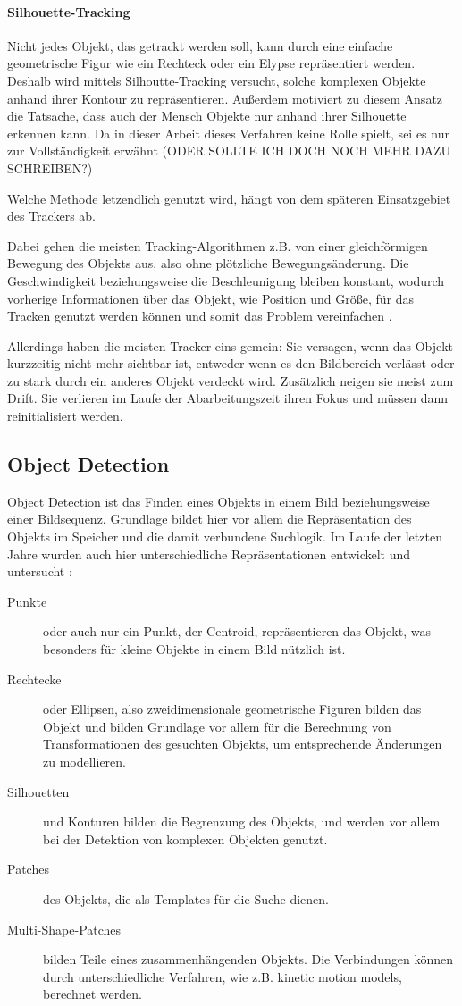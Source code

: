 \paragraph{Silhouette-Tracking}
Nicht jedes Objekt, das getrackt werden soll, kann durch eine einfache geometrische Figur wie ein Rechteck oder ein Elypse repräsentiert werden. Deshalb wird mittels Silhoutte-Tracking versucht, solche komplexen Objekte anhand ihrer Kontour zu repräsentieren. Außerdem motiviert zu diesem Ansatz die Tatsache, dass auch der Mensch Objekte nur anhand ihrer Silhouette erkennen kann. Da in dieser Arbeit dieses Verfahren keine Rolle spielt, sei es nur zur Vollständigkeit erwähnt (ODER SOLLTE ICH DOCH NOCH MEHR DAZU SCHREIBEN?)

Welche Methode letzendlich genutzt wird, hängt von dem späteren Einsatzgebiet des Trackers ab.

Dabei gehen die meisten Tracking-Algorithmen z.B. von einer gleichförmigen Bewegung des Objekts aus, also ohne plötzliche Bewegungsänderung. Die Geschwindigkeit beziehungsweise die Beschleunigung bleiben konstant, wodurch vorherige Informationen über das Objekt, wie Position und Größe, für das Tracken genutzt werden können und somit das Problem vereinfachen \cite{OTS}.

Allerdings haben die meisten Tracker eins gemein: Sie versagen, wenn das Objekt kurzzeitig nicht mehr sichtbar ist, entweder wenn es den Bildbereich verlässt oder zu stark durch ein anderes Objekt verdeckt wird. Zusätzlich neigen sie meist zum Drift. Sie verlieren im Laufe der Abarbeitungszeit ihren Fokus und müssen dann reinitialisiert werden.

\subsection{Object Detection}
Object Detection ist das Finden eines Objekts in einem Bild beziehungsweise einer Bildsequenz. Grundlage bildet hier vor allem die Repräsentation des Objekts im Speicher und die damit verbundene Suchlogik. Im Laufe der letzten Jahre wurden auch hier unterschiedliche Repräsentationen entwickelt und untersucht \cite{OTS}:

\begin{description}
\item [{Punkte}] oder auch nur ein Punkt, der Centroid, repräsentieren das Objekt, was besonders für kleine Objekte in einem Bild nützlich ist.
\item [{Rechtecke}] oder Ellipsen, also zweidimensionale geometrische Figuren bilden das Objekt und bilden Grundlage vor allem für die Berechnung von Transformationen des gesuchten Objekts, um entsprechende Änderungen zu modellieren.
\item [{Silhouetten}] und Konturen bilden die Begrenzung des Objekts, und werden vor allem bei der Detektion von komplexen Objekten genutzt.
\item [{Patches}] des Objekts, die als Templates für die Suche dienen.
\item [{Multi-Shape-Patches}] bilden Teile eines zusammenhängenden Objekts. Die Verbindungen können durch unterschiedliche Verfahren, wie z.B. kinetic motion models, berechnet werden.
\end{description}

